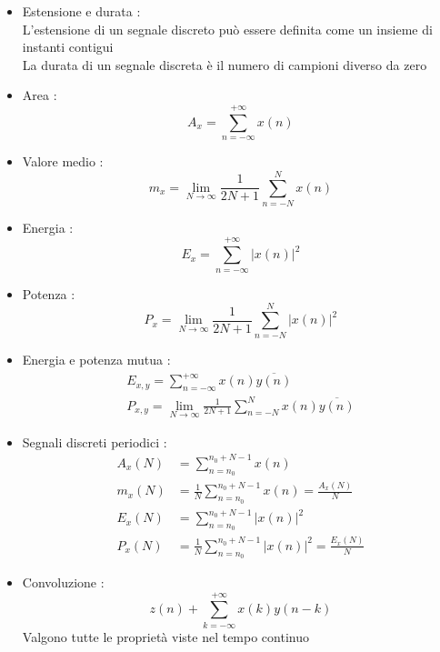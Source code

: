 \documentclass{article}
\theoremstyle{definition}
\begin{document}
\begin{itemize}
\begin{itemize}
\end{itemize}
	\item Estensione e durata : \\
	L'estensione di un segnale discreto può essere definita come un insieme di instanti contigui \\ 
	La durata di un segnale discreta è il numero di campioni diverso da zero 
	\item Area : 
	$$A_x=\sum_{n=-\infty}^{+\infty}x(n)$$
	\item Valore medio : 
	$$m_x=\lim_{N\rightarrow \infty }\frac{1}{2N+1}\sum_{n=-N}^{N}x(n)$$
	\item Energia :
	$$E_x=\sum_{n=-\infty}^{+\infty}|x(n)|^2$$
	\item Potenza : 
	$$P_x=\lim_{N\rightarrow \infty }\frac{1}{2N+1}\sum_{n=-N}^{N}|x(n)|^2$$
	\item Energia e potenza mutua : 
	\begin{align*}
		E_{x,y}=\sum_{n=-\infty}^{+\infty} x(n)\overline{y(n)} \\
		P_{x,y}=\lim_{N\rightarrow \infty }\frac{1}{2N+1}\sum_{n=-N}^{N}x(n)\overline{y(n)}
	\end{align*}
	\item Segnali discreti periodici :
	\begin{align*}
		A_x(N) &= \sum_{n=n_0}^{n_0+N-1} x(n) \\
		m_x(N) &= \frac{1}{N} \sum_{n=n_0}^{n_0+N-1} x(n) = \frac{A_x(N)}{N} \\
		E_x(N) &= \sum_{n=n_0}^{n_0+N-1} |x(n)|^2 \\
		P_x(N) &= \frac{1}{N} \sum_{n=n_0}^{n_0+N-1} |x(n)|^2 = \frac{E_x(N)}{N}
	\end{align*}
	\item Convoluzione : 
	$$z(n)+\sum_{k=-\infty}^{+\infty}x(k)y(n-k)$$
	Valgono tutte le proprietà viste nel tempo continuo
	\end{itemize}
\end{document}
